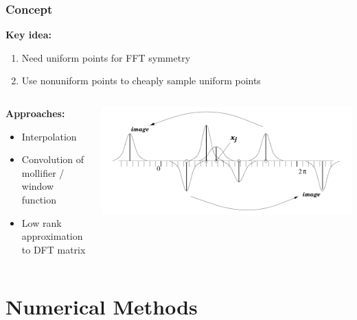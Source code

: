 \documentclass{beamer}
\begin{document}
\begin{frame}
  \frametitle{Concept}
  \textbf{Key idea:}
  \begin{enumerate}
      \item Need uniform points for FFT symmetry
      \item Use nonuniform points to cheaply sample uniform points
  \end{enumerate}

  \vfill

  \begin{columns}
      \begin{column}{.5\textwidth}
        \textbf{Approaches:}
        \begin{itemize}
            \item Interpolation
            \item Convolution of mollifier / window function
            \item Low rank approximation to DFT matrix
        \end{itemize}
      \end{column}
      \begin{column}{.5\textwidth}
        \centering \includegraphics[width=\textwidth]{images/sample_gaussian.png}
      \end{column}
  \end{columns}
\end{frame}


\section{Numerical Methods}
\begin{frame}
    \sectionpage
\end{frame}
\end{document}
